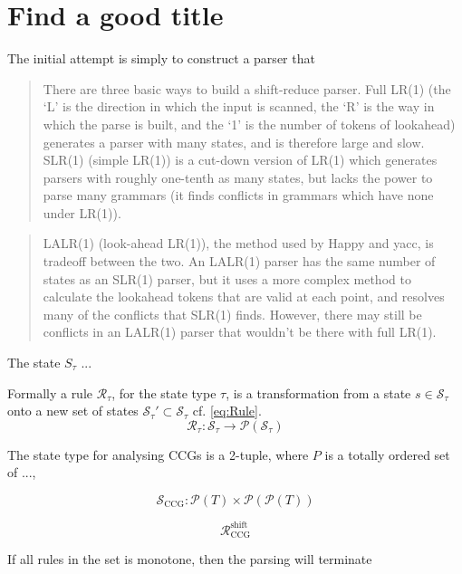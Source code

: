 \cite{cs}


\section{Find a good title}
The initial attempt is simply to construct a parser that 

\begin{quote}
	There are three basic ways to build a shift-reduce parser. Full LR(1) (the `L' is the direction in which the input is scanned, the `R' is the way in which the parse is built, and the `1' is the number of tokens of lookahead) generates a parser with many states, and is therefore large and slow. SLR(1) (simple LR(1)) is a cut-down version of LR(1) which generates parsers with roughly one-tenth as many states, but lacks the power to parse many grammars (it finds conflicts in grammars which have none under LR(1)).
\end{quote}

\begin{quote}
LALR(1) (look-ahead LR(1)), the method used by Happy and yacc, is tradeoff between the two. An LALR(1) parser has the same number of states as an SLR(1) parser, but it uses a more complex method to calculate the lookahead tokens that are valid at each point, and resolves many of the conflicts that SLR(1) finds. However, there may still be conflicts in an LALR(1) parser that wouldn't be there with full LR(1).
\end{quote}

The state $S_\tau$ ...

Formally a rule $\mathcal{R}_\tau$, for the state type $\tau$, is a transformation from a state $s \in \mathcal{S}_\tau$ onto a new set of states $\mathcal{S}_\tau' \subset \mathcal{S}_\tau$ cf. \ref{eq:Rule}.
\begin{equation}
	\mathcal{R}_\tau : \mathcal{S}_\tau \to \mathcal{P}(\mathcal{S}_\tau)
	\label{eq:Rule}
\end{equation} 

The state type for analysing CCGs is a 2-tuple, where $P$ is  a totally ordered set of ..., 

$$\mathcal{S}_\mathrm{CCG} : \mathcal{P}(T) \times \mathcal{P}(\mathcal{P}(T))$$

\begin{equation}
	\mathcal{R}^\mathrm{shift}_\mathrm{CCG}
\end{equation}

If all rules in the set is monotone, then the parsing will terminate 